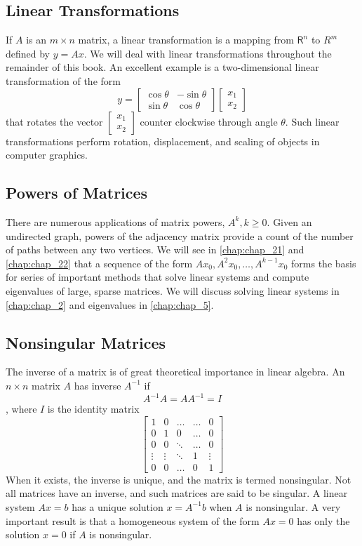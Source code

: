 \documentclass[../main.tex]{subfiles}
\begin{document}
\subsection*{Linear Transformations}
If $A$ is an $m \times n$ matrix, a linear transformation is a mapping from $\mathsf{R}^{n}$ to $R^{m}$ defined by $y=A x .$ We will deal with linear transformations throughout the remainder of this book. An excellent example is a two-dimensional linear transformation of the form
$$
y=\left[\begin{array}{cc}
\cos \theta & -\sin \theta \\
\sin \theta & \cos \theta
\end{array}\right]\left[\begin{array}{l}
x_{1} \\
x_{2}
\end{array}\right]
$$
that rotates the vector $\left[\begin{array}{l}x_{1} \\ x_{2}\end{array}\right]$ counter clockwise through angle $\theta .$ Such linear transformations perform rotation, displacement, and scaling of objects in computer graphics.

\subsection*{Powers of Matrices}
There are numerous applications of matrix powers, $A^{k}, k \geq 0 .$ Given an undirected graph, powers of the adjacency matrix provide a count of the number of paths between any two vertices.
We will see in \autoref{chap:chap_21}  and \ref{chap:chap_22} that
a sequence of the form $A x_{0}, A^{2} x_{0}, \ldots, A^{k-1} x_{0}$  forms the basis for series of important methods that solve linear systems and compute eigenvalues of large, sparse matrices.
We will discuss solving linear systems in \autoref{chap:chap_2} and eigenvalues in \autoref{chap:chap_5}.

\subsection*{Nonsingular Matrices}
The inverse of a matrix is of great theoretical importance in linear algebra. An $n \times n$ matrix $A$ has inverse $A^{-1}$ if
$$A^{-1} A=A A^{-1}=I$$,
where $I$ is the identity matrix
$$
\left[\begin{array}{ccccc}
1 & 0 & \ldots & \ldots & 0 \\
0 & 1 & 0 & \ldots & 0 \\
0 & 0 & \ddots & \ldots & 0 \\
\vdots & \vdots & \ddots & 1 & \vdots \\
0 & 0 & \ldots & 0 & 1
\end{array}\right]
$$
When it exists, the inverse is unique, and the matrix is termed nonsingular. Not all matrices have an inverse, and such matrices are said to be singular. A linear system $A x=b$ has a unique solution $x=A^{-1} b$ when $A$ is nonsingular. A very important result is that a homogeneous system of the form $A x=0$ has only the solution $x=0$ if $A$ is nonsingular.
\end{document}
